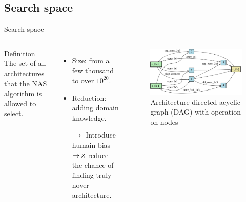 \documentclass[aspectratio=169,xcolor=dvipsnames]{beamer}
\newcommand{\xmark}{%
\tikz[scale=0.15] {
      \draw[line width=0.7,line cap=round] (0,0) to [bend left=6] (1,1);
      \draw[line width=0.7,line cap=round] (0.2,0.95) to [bend right=3] (0.8,0.05);
}}
\begin{document}
\subsection{Search space}
\begin{frame}{Search space}
    \begin{columns}[c] %
        \begin{block}{Definition}
            The set of all architectures that the NAS algorithm is allowed to select.
        \end{block}
        \begin{itemize}
            \item Size: from a few thousand to over $ 10^{20} $.
            \item Reduction: adding domain knowledge.
            \item [$\rightarrow$] Introduce humain bias $\rightarrow \xmark $ reduce the chance of finding truly nover architecture.
        \end{itemize}
        \begin{figure}[H]
            \centering
            \includegraphics[width=\textwidth]{architecture.jpg} %
            \caption{Architecture directed acyclic graph (DAG) with operation on nodes}
        \end{figure}
    \end{columns}
\end{frame}
\end{document}
